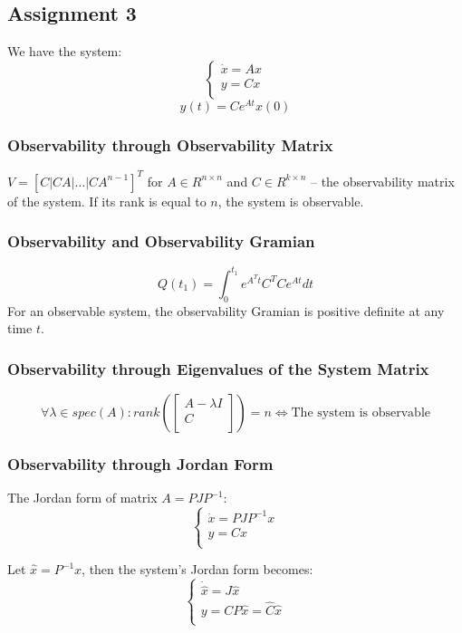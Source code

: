 \subsection{Assignment 3}
We have the system:
\[
\begin{cases}
    \dot{x} = A x \\
    y = Cx  \\
\end{cases}
\]
\[
        y(t) = C e^{At} x(0)
\]
\subsubsection{Observability through Observability Matrix}
\(V = [C | CA | \hdots | CA^{n-1}]^T\) for \(A \in R^{n \times n}\) and \(C \in R^{k \times n}\) -- the observability matrix of the system. If its rank is equal to \(n\), the system is observable.

\subsubsection{Observability and Observability Gramian}
\[Q(t_1) = \int_0^{t_1} e^{A^T t} C^T C e^{A t} dt\]
For an observable system, the observability Gramian is positive definite at any time \(t\).

\subsubsection{Observability through Eigenvalues of the System Matrix}
\[\forall \lambda \in spec(A): rank(\begin{bmatrix}
        A - \lambda I  \\
        C \\
        \end{bmatrix}) = n \Longleftrightarrow \text{The system is observable} \]

\subsubsection{Observability through Jordan Form}
The Jordan form of matrix \(A = P J P^{-1}\):
\[
        \begin{cases}
                \dot{x} = P J P^{-1} x \\
                y = Cx  \\
        \end{cases}
\]

Let \(\hat{x} = P^{-1}x\), then the system's Jordan form becomes:
\[
        \begin{cases}
                \dot{\hat{x}} = J\hat{x} \\
                y = CP\hat{x} = \hat{C}\hat{x} \\
        \end{cases}
\]

